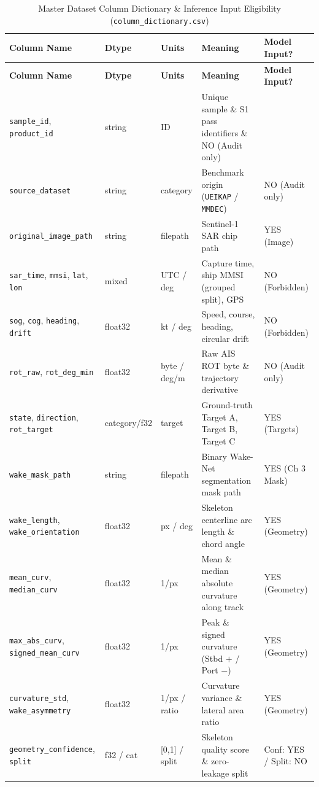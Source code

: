 \documentclass[11pt,a4paper]{article}
\begin{document}
{\footnotesize
\begin{longtable}{|p{3.6cm}|p{1.5cm}|p{1.6cm}|p{4.3cm}|p{2.3cm}|}
\caption{Master Dataset Column Dictionary \& Inference Input Eligibility (\texttt{column\_dictionary.csv})}
\label{tab:col_dict} \\
\hline
\rowcolor{ruetgray}
\textbf{Column Name} & \textbf{Dtype} & \textbf{Units} & \textbf{Meaning} & \textbf{Model Input?} \\ \hline
\endfirsthead
\hline
\rowcolor{ruetgray}
\textbf{Column Name} & \textbf{Dtype} & \textbf{Units} & \textbf{Meaning} & \textbf{Model Input?} \\ \hline
\endhead
\texttt{sample\_id}, \texttt{product\_id} & string & ID & Unique sample \& S1 pass identifiers \& NO (Audit only) \\ \hline
\texttt{source\_dataset} & string & category & Benchmark origin (\texttt{UEIKAP} / \texttt{MMDEC}) & NO (Audit only) \\ \hline
\texttt{original\_image\_path} & string & filepath & Sentinel-1 SAR chip path & YES (Image) \\ \hline
\texttt{sar\_time}, \texttt{mmsi}, \texttt{lat}, \texttt{lon} & mixed & UTC / deg & Capture time, ship MMSI (grouped split), GPS & NO (Forbidden) \\ \hline
\texttt{sog}, \texttt{cog}, \texttt{heading}, \texttt{drift} & float32 & kt / deg & Speed, course, heading, circular drift & NO (Forbidden) \\ \hline
\texttt{rot\_raw}, \texttt{rot\_deg\_min} & float32 & byte / deg/m & Raw AIS ROT byte \& trajectory derivative & NO (Audit only) \\ \hline
\texttt{state}, \texttt{direction}, \texttt{rot\_target} & category/f32 & target & Ground-truth Target A, Target B, Target C & YES (Targets) \\ \hline
\texttt{wake\_mask\_path} & string & filepath & Binary Wake-Net segmentation mask path & YES (Ch 3 Mask) \\ \hline
\texttt{wake\_length}, \texttt{wake\_orientation} & float32 & px / deg & Skeleton centerline arc length \& chord angle & YES (Geometry) \\ \hline
\texttt{mean\_curv}, \texttt{median\_curv} & float32 & 1/px & Mean \& median absolute curvature along track & YES (Geometry) \\ \hline
\texttt{max\_abs\_curv}, \texttt{signed\_mean\_curv} & float32 & 1/px & Peak \& signed curvature (Stbd $+$ / Port $-$) & YES (Geometry) \\ \hline
\texttt{curvature\_std}, \texttt{wake\_asymmetry} & float32 & 1/px / ratio & Curvature variance \& lateral area ratio & YES (Geometry) \\ \hline
\texttt{geometry\_confidence}, \texttt{split} & f32 / cat & [0,1] / split & Skeleton quality score \& zero-leakage split & Conf: YES / Split: NO \\ \hline
\end{longtable}
}
\end{document}
